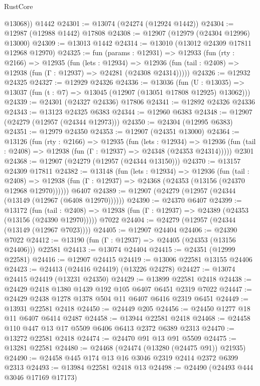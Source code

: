 \begin{lexlean}{RustCore}
\begin{coremodule}
        @13068))
    @1442
@24301 := @13074 (@24274 (@12924 @1442))
@24304 := @12987 (@12988 @1442) @17808
@24308 := @12907 (@12979 (@24304 @12996) @13000)
@24309 := @13013 @1442
@24314 := @13010 (@13012 @24309 @17811 @12968 @12970)
@24325 := fun (params : @12931) =>
  @12933
    (fun (rty : @2166) =>
    @12935
      (fun (lets : @12934) =>
      @12936 (fun (tail : @2408) => @12938 (fun (Γ : @12937) => @24281 (@24308 @24314)))))
@24326 := @12932 @24325
@24327 := @12929 @24326
@24336 := @13036
    (fun (U : @13035) => @13037 (fun (t : @7) => @13045 (@12907 (@13051 @17808 @12925) @13062)))
@24339 := @24301 (@24327 @24336) @17806
@24341 := @12892 @24326 @24336
@24343 := @13123 @24325 @6383
@24344 := @12960 @6383
@24348 := @12907 (@24279 (@12957 (@24344 @12973)))
@24350 := @24304 (@12995 @6383)
@24351 := @12979 @24350
@24353 := @12907 (@24351 @13000)
@24364 := @13126
    (fun (rty : @2166) =>
    @12935
      (fun (lets : @12934) =>
      @12936 (fun (tail : @2408) => @12938 (fun (Γ : @12937) => @24348 (@24353 @24314)))))
    @2301
@24368 := @12907 (@24279 (@12957 (@24344 @13150)))
@24370 := @13157 @24309 @17811
@24382 := @13148
    (fun (lets : @12934) =>
    @12936
      (fun (tail : @2408) =>
      @12938 (fun (Γ : @12937) => @24368 (@24353 (@13156 (@24370 @12968 @12970))))))
    @6407
@24389 := @12907 (@24279 (@12957 (@24344 (@13149 (@12967 (@6408 @12970))))))
@24390 := @24370 @6407
@24399 := @13172
    (fun (tail : @2408) => @12938 (fun (Γ : @12937) => @24389 (@24353 (@13156 (@24390 @12970)))))
    @7022
@24404 := @24279 (@12957 (@24344 (@13149 (@12967 @7023))))
@24405 := @12907 @24404
@24406 := @24390 @7022
@24412 := @13190 (fun (Γ : @12937) => @24405 (@24353 (@13156 @24406))) @22581
@24413 := @13074 @24404
@24415 := @24351 (@12999 @22581)
@24416 := @12907 @24415
@24419 := @13006 @22581 @13155 @24406
@24423 := @24413 (@24416 @24419) (@13226 @24278)
@24427 := @13074 @24415 @24419 (@13231 @24350)
@24429 := @13899 @22581 @2418
@24438 := @24429 @2418 @1380 @1439 @192 @105 @6407 @6451 @2319 @7022
@24447 := @24429 @2438 @1278 @1378 @504 @11 @6407 @6416 @2319 @6451
@24449 := @13931 @22581 @2418
@24450 := @24449 @205
@24456 := @24450 @1277 @18 @11 @6407 @6414 @2487
@24458 := @13944 @22581 @2418
@24468 := @24458 @110 @447 @13 @17 @5509 @6406 @6413 @2372 @6389 @2313
@24470 := @13272 @22581 @2418
@24474 := @24470 @91 @13 @91 @5509
@24475 := @13281 @22581
@24480 := @24468 (@24474 (@13280 (@24475 @91)) @21935)
@24490 := @24458 @445 @174 @13 @16 @3046 @2319 @2414 @2372 @6399 @2313
@24493 := @13984 @22581 @2418 @13
@24498 := @24490 (@24493 @444 @3046 @17169 @17173)

\end{coremodule}
\end{lexlean}
